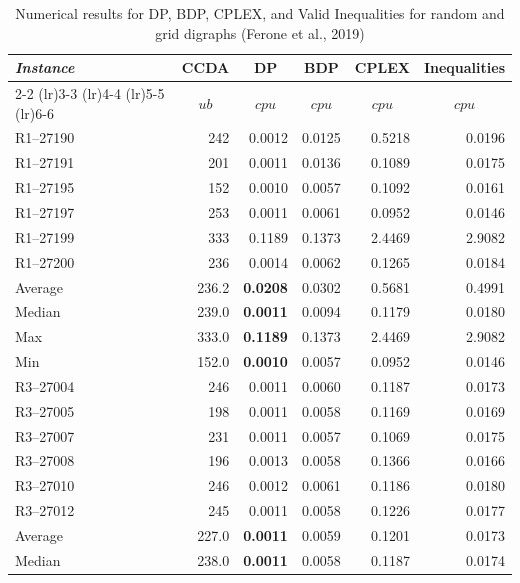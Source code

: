 \documentclass[pdflatex,sn-mathphys-num]{sn-jnl}
\begin{document}
\begin{table}[htbp]
\centering
\caption{Numerical results for DP, BDP, CPLEX, and Valid Inequalities for random and grid digraphs (Ferone et al., 2019)}
\label{tab:numerical_results_ferone}
\begin{tabular*}{\textwidth}{l@{\extracolsep{\fill}}rrrrr}
\toprule
\textit{Instance} & \multicolumn{1}{c}{CCDA} & \multicolumn{1}{c}{DP} & \multicolumn{1}{c}{BDP} & \multicolumn{1}{c}{CPLEX} & \multicolumn{1}{c}{Inequalities} \\
\cmidrule(lr){2-2} \cmidrule(lr){3-3} \cmidrule(lr){4-4} \cmidrule(lr){5-5} \cmidrule(lr){6-6}
 & \multicolumn{1}{c}{$ub$} & \multicolumn{1}{c}{$cpu$} & \multicolumn{1}{c}{$cpu$} & \multicolumn{1}{c}{$cpu$} & \multicolumn{1}{c}{$cpu$} \\
\midrule
R1--27190 & 242 & 0.0012 & 0.0125 & 0.5218 & 0.0196 \\
R1--27191 & 201 & 0.0011 & 0.0136 & 0.1089 & 0.0175 \\
R1--27195 & 152 & 0.0010 & 0.0057 & 0.1092 & 0.0161 \\
R1--27197 & 253 & 0.0011 & 0.0061 & 0.0952 & 0.0146 \\
R1--27199 & 333 & 0.1189 & 0.1373 & 2.4469 & 2.9082 \\
R1--27200 & 236 & 0.0014 & 0.0062 & 0.1265 & 0.0184 \\
\midrule
Average & 236.2 & \textbf{0.0208} & 0.0302 & 0.5681 & 0.4991 \\
Median & 239.0 & \textbf{0.0011} & 0.0094 & 0.1179 & 0.0180 \\
Max & 333.0 & \textbf{0.1189} & 0.1373 & 2.4469 & 2.9082 \\
Min & 152.0 & \textbf{0.0010} & 0.0057 & 0.0952 & 0.0146 \\
\midrule
R3--27004 & 246 & 0.0011 & 0.0060 & 0.1187 & 0.0173 \\
R3--27005 & 198 & 0.0011 & 0.0058 & 0.1169 & 0.0169 \\
R3--27007 & 231 & 0.0011 & 0.0057 & 0.1069 & 0.0175 \\
R3--27008 & 196 & 0.0013 & 0.0058 & 0.1366 & 0.0166 \\
R3--27010 & 246 & 0.0012 & 0.0061 & 0.1186 & 0.0180 \\
R3--27012 & 245 & 0.0011 & 0.0058 & 0.1226 & 0.0177 \\
\midrule
Average & 227.0 & \textbf{0.0011} & 0.0059 & 0.1201 & 0.0173 \\
Median & 238.0 & \textbf{0.0011} & 0.0058 & 0.1187 & 0.0174 \\

\end{tabular*}
\end{table}
\end{document}

